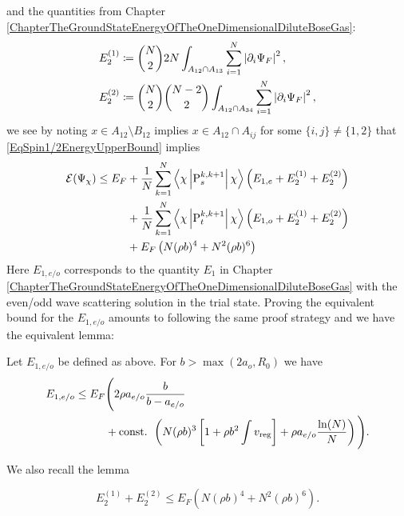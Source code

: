 and the quantities from Chapter \ref{ChapterTheGroundStateEnergyOfTheOneDimensionalDiluteBoseGas}:\begin{equation}
\begin{aligned}
E_2^{(1)}&\coloneqq\binom{N}{2}2N\int_{A_{12}\cap A_{13}}\sum_{i=1}^{N}\left\lvert \partial_i\Psi_F \right\rvert^2,\\ E_2^{(2)}&\coloneqq\binom{N}{2}\binom{N-2}{2}\int_{A_{12}\cap A_{34}}\sum_{i=1}^{N}\left\lvert \partial_i\Psi_F \right\rvert^2,
\end{aligned}
\end{equation}
we see by noting $x\in A_{12}\setminus B_{12}$ implies $x\in A_{12}\cap A_{ij}$ for some $\{i,j\}\neq \{1,2\}$ that \eqref{EqSpin1/2EnergyUpperBound} implies \begin{equation}\label{EqTrialStateEnergyUpperBound2}
\begin{aligned}
\mathcal{E}(\Psi_{\chi})\leq E_F &+\frac{1}{N}\sum_{k=1}^{N}\left\langle\chi \left\lvert \operatorname{P}^{k,k+1}_s  \right\rvert \chi\right\rangle \left(E_{1,e}+E_2^{(1)}+E_2^{(2)}\right)\\
&+\frac{1}{N}\sum_{k=1}^{N}\left\langle\chi \left\lvert \operatorname{P}^{k,k+1}_t  \right\rvert \chi\right\rangle \left(E_{1,o}+E_2^{(1)}+E_2^{(2)}\right)\\
&+E_F\left(N(\rho b)^4+ N^2 (\rho b)^6\right)
\end{aligned}
\end{equation}
Here $ E_{1,e/o} $ corresponds to the quantity $ E_1 $ in Chapter \ref{ChapterTheGroundStateEnergyOfTheOneDimensionalDiluteBoseGas} with the even/odd wave scattering solution in the trial state. Proving the equivalent bound for the $ E_{1,e/o} $ amounts to following the same proof strategy and we have the equivalent lemma:
\begin{lemma}\label{LemmaE1BoundSpin1/2}
	Let $ E_{1,e/o} $ be defined as above. For $ b>\max(2a_o,R_0) $ we have \begin{equation}
	\begin{aligned}
	E_{1,e/o}\leq E_F&\Bigg(2\rho a_{e/o}\frac{b}{b-a_{e/o}}\\&+ \textnormal{const. }\left( N(\rho b)^3\left[ 1+ \rho b^2\int v_{\textnormal{reg}}\right]+\rho a_{e/o} \frac{\ln(N)}{N}\right)\Bigg).
	\end{aligned}
	\end{equation}
\end{lemma}
We also recall the lemma\begin{lemma}\label{LemmaE2BoundSpin1/2}
	\begin{equation}
	E_2^{(1)}+E_2^{(2)}\leq E_F\left(N (\rho b)^4+ N^2(\rho b)^6\right).
	\end{equation}
\end{lemma}
